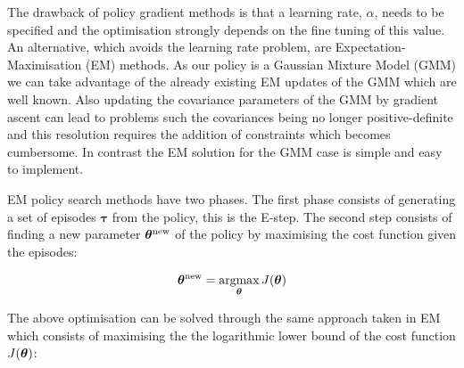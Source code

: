 \begin{appendices}
The drawback of policy gradient methods is that a learning rate, $\alpha$, needs to be specified and the optimisation strongly depends 
on the fine tuning of this value. An alternative, which avoids
the learning rate problem, are Expectation-Maximisation (EM) methods. As our policy is a Gaussian Mixture Model (GMM) we can take advantage of 
the already existing EM updates of the GMM which are well known. Also updating the covariance parameters of the GMM by gradient ascent can lead 
to problems such the covariances being no longer positive-definite and this resolution requires the addition of constraints which becomes 
cumbersome. In contrast the EM solution for the GMM case is simple and easy to implement.

EM policy search methods have two phases. The first phase consists of generating a set of episodes $\boldsymbol{\tau}$ from 
the policy, this is the E-step. The second step consists of finding a new parameter $\boldsymbol{\theta}^{\mathrm{new}}$ of the policy 
by maximising the cost function given the episodes:

\begin{equation}
  \Param^{\mathrm{new}} = \argmax\limits_{\Param} J(\Param) \label{eq:ch4:argmax}
\end{equation}

The above optimisation can be solved through the same approach taken in EM which consists of 
maximising the the logarithmic lower bound of the cost function $J(\boldsymbol{\theta})$: 





\end{appendices}
